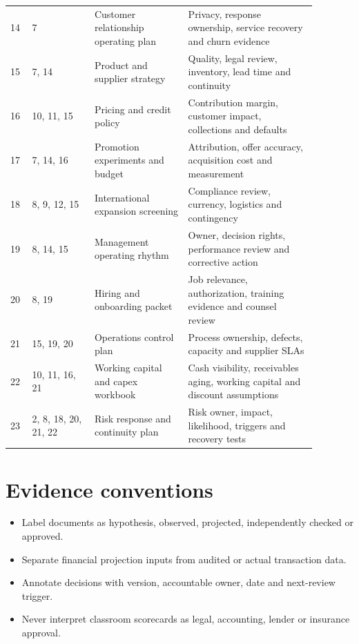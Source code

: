 \documentclass[11pt]{article}
\begin{document}
\begin{longtable}{p{0.06\linewidth}p{0.18\linewidth}p{0.27\linewidth}p{0.37\linewidth}}
14 & 7 & Customer relationship operating plan & Privacy, response ownership, service recovery and churn evidence\\
15 & 7, 14 & Product and supplier strategy & Quality, legal review, inventory, lead time and continuity\\
16 & 10, 11, 15 & Pricing and credit policy & Contribution margin, customer impact, collections and defaults\\
17 & 7, 14, 16 & Promotion experiments and budget & Attribution, offer accuracy, acquisition cost and measurement\\
18 & 8, 9, 12, 15 & International expansion screening & Compliance review, currency, logistics and contingency\\
19 & 8, 14, 15 & Management operating rhythm & Owner, decision rights, performance review and corrective action\\
20 & 8, 19 & Hiring and onboarding packet & Job relevance, authorization, training evidence and counsel review\\
21 & 15, 19, 20 & Operations control plan & Process ownership, defects, capacity and supplier SLAs\\
22 & 10, 11, 16, 21 & Working capital and capex workbook & Cash visibility, receivables aging, working capital and discount assumptions\\
23 & 2, 8, 18, 20, 21, 22 & Risk response and continuity plan & Risk owner, impact, likelihood, triggers and recovery tests\\
\bottomrule\end{longtable}
\section{Evidence conventions}
\begin{itemize}[leftmargin=*,itemsep=3pt]
\item Label documents as hypothesis, observed, projected, independently checked or approved.
\item Separate financial projection inputs from audited or actual transaction data.
\item Annotate decisions with version, accountable owner, date and next-review trigger.
\item Never interpret classroom scorecards as legal, accounting, lender or insurance approval.
\end{itemize}
\end{document}
